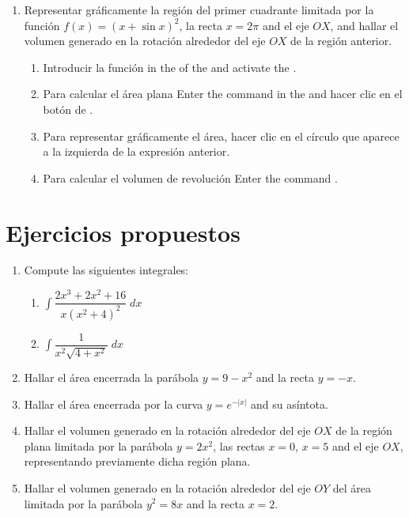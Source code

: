 \begin{enumerate}[leftmargin=*]
\item Representar gráficamente la región del primer cuadrante limitada por la función $f(x)=(x+\sin x)^2$, la recta $x=2\pi$ and el eje $OX$, and hallar el volumen generado en la rotación alrededor del eje $OX$ de la región anterior.
      \begin{indication}
      \begin{enumerate}
      \item Introducir la función  in the  of the   and activate the .
      \item Para calcular el área plana Enter the command  in the  and hacer clic en el botón de .
      \item Para representar gráficamente el área, hacer clic en el círculo que aparece a la izquierda de la expresión anterior.
      \item Para calcular el volumen de revolución Enter the command .
      \end{enumerate}
      \end{indication}

\end{enumerate}


\section{Ejercicios propuestos}
\begin{enumerate}[leftmargin=*]
\item Compute las siguientes integrales:
      \begin{enumerate}
      \item $ \int{\dfrac{2x^{3}+2x^{2}+16}{x(x^{2}+4)^{2}}\;dx}$
      \item $ \int{\dfrac{1}{x^{2}\sqrt{4+x^{2}}}\;dx}$
      \end{enumerate}

\item Hallar el área encerrada la parábola $y=9-x^{2}$ and la recta $y=-x$.

\item Hallar el área encerrada por la curva $y=e^{-|x|}$ and su asíntota.

\item Hallar el volumen generado en la rotación alrededor del eje $OX$ de la región plana limitada por la parábola $y=2x^{2}$, las rectas
      $x=0$, $x=5$ and el eje $OX$, representando previamente dicha región plana.

\item Hallar el volumen generado en la rotación alrededor del eje $OY$ del área limitada por la parábola $y^{2}=8x$ and la recta $x=2$.

\end{enumerate}
